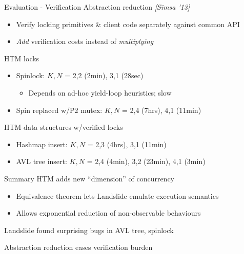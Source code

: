 \documentclass[xcolor=dvipsnames]{beamer}
\begin{document}
\begin{frame}{Evaluation - Verification}
	Abstraction reduction {\em [Simsa '13]}
	\begin{itemize}
		\item Verify locking primitives \& client code separately against common API
		\item {\em Add} verification costs instead of {\em multiplying}
	\end{itemize}
	\linegap

	HTM locks
	\begin{itemize}
		\item Spinlock: $K,N$ = 2,2 (2min), 3,1 (28sec)
			\begin{itemize}
				\item Depends on ad-hoc yield-loop heuristics; slow
			\end{itemize}
		\item Spin replaced w/P2 mutex: $K,N$ = 2,4 (7hrs), 4,1 (11min)
	\end{itemize}
	\pause
	\linegap

	HTM data structures w/verified locks
	\begin{itemize}
		\item Hashmap insert: $K,N$ = 2,3 (4hrs), 3,1 (11min)
		\item AVL tree insert: $K,N$ = 2,4 (4min), 3,2 (23min), 4,1 (3min)
	\end{itemize}
\end{frame}

\begin{frame}{Summary}
	HTM adds new ``dimension'' of concurrency
	\begin{itemize}
		\item Equivalence theorem lets Landslide emulate execution semantics
		\item Allows exponential reduction of non-observable behaviours
	\end{itemize}
	\linegap

	Landslide found surprising bugs in AVL tree, spinlock
	\linegap


	Abstraction reduction eases %
	verification burden
\end{frame}
\end{document}
